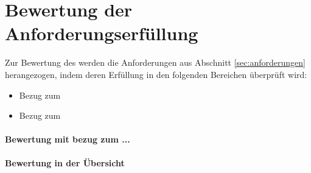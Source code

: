 \section{Bewertung der Anforderungserfüllung}\label{sec:Evaluierung}
Zur Bewertung des  werden die Anforderungen aus Abschnitt \ref{sec:anforderungen} herangezogen, indem deren Erfüllung in den folgenden Bereichen überprüft wird:

\begin{itemize}
	\item Bezug zum
    \item Bezug zum
\end{itemize}

\paragraph{Bewertung mit bezug zum ...}


\paragraph{Bewertung in der Übersicht}

